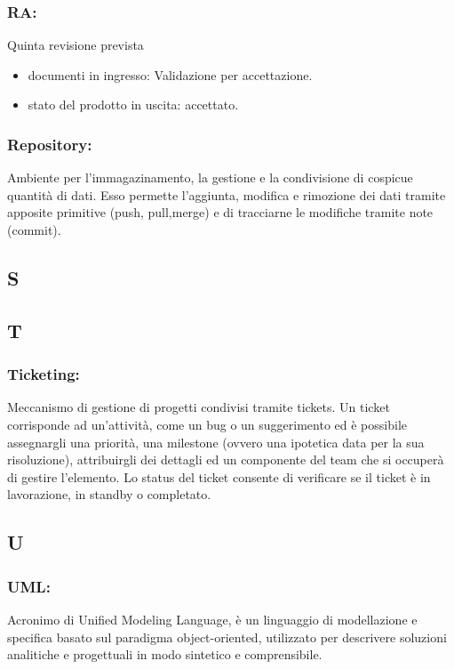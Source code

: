 \subsubsection*{RA:} Quinta revisione prevista
\begin{itemize}
\item documenti in ingresso: Validazione per accettazione.
\item stato del prodotto in uscita: accettato. 
\end{itemize}

\subsubsection*{Repository:} Ambiente per l'immagazinamento, la gestione e la
condivisione di cospicue quantit\`a di dati. Esso permette l'aggiunta,
 modifica e rimozione dei dati tramite apposite primitive (push, pull,merge)
  e di tracciarne le modifiche tramite note (commit).
\subsection*{\huge{S}}
\subsection*{\huge{T}}
\subsubsection*{Ticketing:} Meccanismo di gestione di progetti condivisi tramite
tickets. Un ticket corrisponde ad un'attivit\`a, come un bug o un suggerimento
ed \`e possibile assegnargli una priorit\`a, una milestone (ovvero una ipotetica
data per la sua risoluzione), attribuirgli dei dettagli ed un componente del
team che si occuper\`a di gestire l'elemento. Lo status del ticket consente di
verificare se il ticket \`e in lavorazione, in standby o completato.

\subsection*{\huge{U}}
\subsubsection*{UML:} Acronimo di Unified Modeling Language, \`e un linguaggio
di modellazione e specifica basato sul paradigma object-oriented, utilizzato per descrivere soluzioni analitiche e progettuali in modo sintetico e comprensibile.
